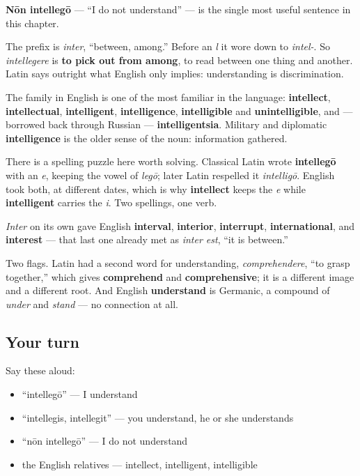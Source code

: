 \textbf{Nōn intellegō} — \textquotedblleft{}I do not understand\textquotedblright{} — is the single most useful sentence in this chapter.

\begin{cousinweb}
The prefix is \emph{inter}, \textquotedblleft{}between, among.\textquotedblright{} Before an \emph{l} it wore down to \emph{intel-}. So \emph{intellegere} is \textbf{to pick out from among}, to read between one thing and another. Latin says outright what English only implies: understanding is discrimination.

The family in English is one of the most familiar in the language: \textbf{intellect}, \textbf{intellectual}, \textbf{intelligent}, \textbf{intelligence}, \textbf{intelligible} and \textbf{unintelligible}, and — borrowed back through Russian — \textbf{intelligentsia}. Military and diplomatic \textbf{intelligence} is the older sense of the noun: information gathered.

There is a spelling puzzle here worth solving. Classical Latin wrote \textbf{intellegō} with an \emph{e}, keeping the vowel of \emph{legō}; later Latin respelled it \emph{intelligō}. English took both, at different dates, which is why \textbf{intellect} keeps the \emph{e} while \textbf{intelligent} carries the \emph{i}. Two spellings, one verb.

\emph{Inter} on its own gave English \textbf{interval}, \textbf{interior}, \textbf{interrupt}, \textbf{international}, and \textbf{interest} — that last one already met as \emph{inter est}, \textquotedblleft{}it is between.\textquotedblright{}

Two flags. Latin had a second word for understanding, \emph{comprehendere}, \textquotedblleft{}to grasp together,\textquotedblright{} which gives \textbf{comprehend} and \textbf{comprehensive}; it is a different image and a different root. And English \textbf{understand} is Germanic, a compound of \emph{under} and \emph{stand} — no connection at all.
\end{cousinweb}

\subsection*{Your turn}
Say these aloud:

\begin{itemize}
\raggedright
  \item \textquotedblleft{}intellegō\textquotedblright{} — I understand
  \item \textquotedblleft{}intellegis, intellegit\textquotedblright{} — you understand, he or she understands
  \item \textquotedblleft{}nōn intellegō\textquotedblright{} — I do not understand
  \item the English relatives — intellect, intelligent, intelligible
\end{itemize}

